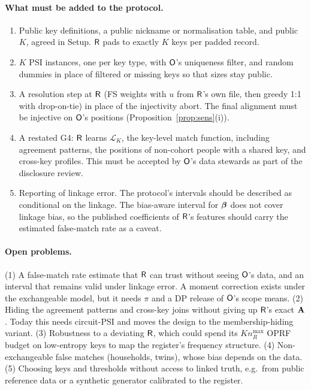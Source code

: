 \paragraph{What must be added to the protocol.}
\begin{enumerate}
\item Public key definitions, a public nickname or normalisation table, and public $K$, agreed in Setup. $\mathsf{R}$ pads to exactly $K$ keys per padded record.
\item $K$ PSI instances, one per key type, with $\mathsf{O}$'s uniqueness filter, and random dummies in place of filtered or missing keys so that sizes stay public.
\item A resolution step at $\mathsf{R}$ (FS weights with $u$ from $\mathsf{R}$'s own file, then greedy 1:1 with drop-on-tie) in place of the injectivity abort. The final alignment must be injective on $\mathsf{O}$'s positions (Proposition~\ref{prop:sens}(i)).
\item A restated G4: $\mathsf{R}$ learns $\mathcal L_K$, the key-level match function, including agreement patterns, the positions of non-cohort people with a shared key, and cross-key profiles. This must be accepted by $\mathsf{O}$'s data stewards as part of the disclosure review.
\item Reporting of linkage error. The protocol's intervals should be described as conditional on the linkage. The bias-aware interval for $\boldsymbol\beta$ does not cover linkage bias, so the published coefficients of $\mathsf{R}$'s features should carry the estimated false-match rate as a caveat.
\end{enumerate}

\paragraph{Open problems.} (1) A false-match rate estimate that $\mathsf{R}$ can trust without seeing $\mathsf{O}$'s data, and an interval that remains valid under linkage error. A moment correction exists under the exchangeable model, but it needs $\pi$ and a DP release of $\mathsf{O}$'s scope means. (2) Hiding the agreement patterns and cross-key joins without giving up $\mathsf{R}$'s exact $\mathbf A$. Today this needs circuit-PSI and moves the design to the membership-hiding variant. (3) Robustness to a deviating $\mathsf{R}$, which could spend its $K n_R^{\max}$ OPRF budget on low-entropy keys to map the register's frequency structure. (4) Non-exchangeable false matches (households, twins), whose bias depends on the data. (5) Choosing keys and thresholds without access to linked truth, e.g.\ from public reference data or a synthetic generator calibrated to the register.
